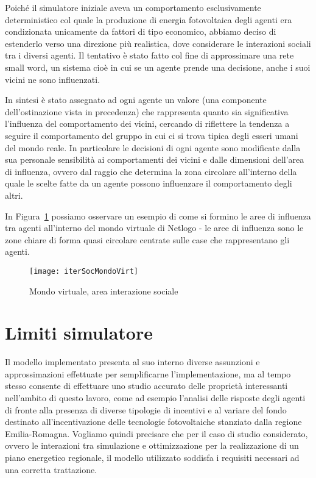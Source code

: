 Poiché il simulatore iniziale aveva un comportamento esclusivamente deterministico col quale la produzione di energia fotovoltaica degli agenti era condizionata unicamente da fattori di tipo economico, abbiamo deciso di estenderlo verso una direzione più realistica, dove considerare le interazioni sociali tra i diversi agenti. Il tentativo è stato fatto col fine di approssimare una rete small word, un sistema cioè in cui se un agente prende una decisione, anche i suoi vicini ne sono influenzati.

In sintesi è stato assegnato ad ogni agente un valore (una componente dell'ostinazione vista in precedenza) che rappresenta quanto sia significativa l'influenza del comportamento dei vicini, cercando di riflettere la tendenza a seguire il comportamento del gruppo in cui ci si trova tipica degli esseri umani del mondo reale. In particolare le decisioni di ogni agente sono modificate dalla sua personale sensibilità ai comportamenti dei vicini e dalle dimensioni dell'area di influenza, ovvero dal raggio che determina la zona circolare all'interno della quale le scelte fatte da un agente possono influenzare il comportamento degli altri.

In Figura~\ref{iterSocMondoVirt} possiamo osservare un esempio di come si formino le aree di influenza tra agenti all'interno del mondo virtuale di Netlogo - le aree di influenza sono le zone chiare di forma quasi circolare centrate sulle case che rappresentano gli agenti.

\begin{figure}[hbt]
	\centering
	\texttt{[image: iterSocMondoVirt]}
	\caption{Mondo virtuale, area interazione sociale}
	\label{iterSocMondoVirt}
\end{figure}

\section{Limiti simulatore}

Il modello implementato presenta al suo interno diverse assunzioni e approssimazioni effettuate per semplificarne l'implementazione, ma al tempo stesso consente di effettuare uno studio accurato delle proprietà interessanti nell'ambito di questo lavoro, come ad esempio l'analisi delle risposte degli agenti di fronte alla presenza di diverse tipologie di incentivi e al variare del fondo destinato all'incentivazione delle tecnologie fotovoltaiche stanziato dalla regione Emilia-Romagna. Vogliamo quindi precisare che per il caso di studio considerato, ovvero le interazioni tra simulazione e ottimizzazione per la realizzazione di un piano energetico regionale, il modello utilizzato soddisfa i requisiti necessari ad una corretta trattazione.

